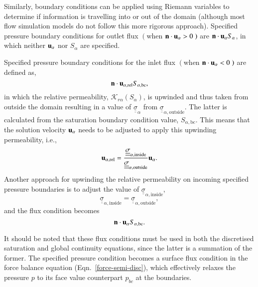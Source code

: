 \documentclass[preprint,authoryear,12pt]{elsarticle}
\begin{document}
\medskip
Similarly, boundary conditions can be applied using Riemann variables to determine if information is travelling into or out of the domain (although most flow simulation models do not follow this more rigorous approach). Specified pressure boundary conditions for outlet flux $\left(\right.$when ${\bf n}\cdot {\bf u}_\alpha>0\left.\right)$ are ${\bf n}\cdot {\bf u}_\alpha {S_\alpha}$, in which neither ${\bf u}_\alpha$ nor ${S_\alpha}$ are specified. 

\medskip
Specified pressure boundary conditions for the inlet flux $\left(\right.$when ${\bf n}\cdot {\bf u}_\alpha<0\left.\right)$ are defined as,
\begin{displaymath}
{\bf n}\cdot {\bf u}_{\alpha,\text{rel}} S_{\alpha,\text{bc}},
\end{displaymath}
in which the relative permeability, $\mathcal{K}_{r\alpha}\left(S_{\alpha}\right)$, is upwinded and thus taken from outside the domain resulting in a value of $\underline{\underline{\sigma}}_{\alpha}$ from $\underline{\underline{\sigma}}_{\alpha,\text{outside}}$. The latter is calculated from the saturation boundary condition value, $S_{\alpha,\text{bc}}$. This means that the solution velocity ${{\bf u}_\alpha}$ needs to be adjusted to apply this upwinding permeability, i.e., 
\begin{equation}
  {\bf u}_{\alpha,\text{rel}} = \displaystyle\frac{ \underline{\underline{\sigma}}_{\alpha,\text{inside}}} { \underline{\underline{\sigma}}_{\alpha,\text{outside}}} {\bf u}_{\alpha}.
\end{equation}
Another approach for upwinding the relative permeability on incoming specified pressure boundaries is to adjust the value of $\underline{\underline{\sigma}}_{\alpha,\text{inside}}$,
\begin{displaymath}
\underline{\underline{\sigma}}_{\alpha,\text{inside}} = \underline{\underline{\sigma}}_{\alpha,\text{outside}},
\end{displaymath}
and the flux condition becomes
\begin{displaymath}
{\bf n}\cdot{\bf u}_{\alpha} S_{\alpha,\text{bc}}.
\end{displaymath}

It should be noted that these flux conditions must be used in both the discretised saturation and global continuity equations, since the latter is a summation of the former. The specified pressure condition becomes a surface flux condition in the force balance equation (Eqn.~\ref{force-semi-disc}), which effectively relaxes the pressure $p$ to its face value counterpart $p_{bc}$ at the boundaries. 
\end{document}
